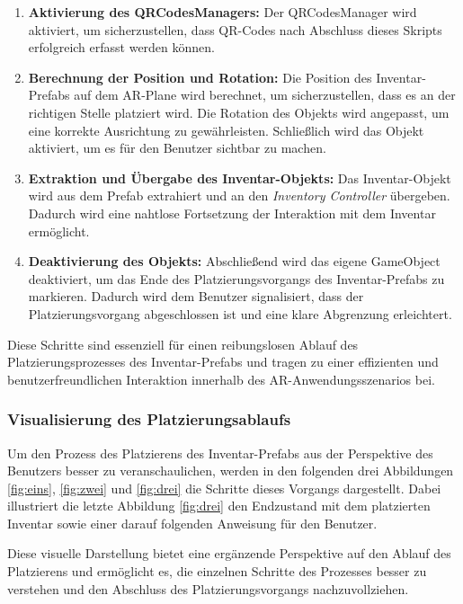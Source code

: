 \begin{enumerate}
    \item \textbf{Aktivierung des QRCodesManagers:} Der QRCodesManager wird aktiviert, um sicherzustellen, dass QR-Codes
    nach Abschluss dieses Skripts erfolgreich erfasst werden können.

    \item \textbf{Berechnung der Position und Rotation:} Die Position des Inventar-Prefabs auf dem AR-Plane wird berechnet,
    um sicherzustellen, dass es an der richtigen Stelle platziert wird. Die Rotation des Objekts wird angepasst, um eine
    korrekte Ausrichtung zu gewährleisten. Schließlich wird das Objekt aktiviert, um es für den Benutzer sichtbar zu machen.

    \item \textbf{Extraktion und Übergabe des Inventar-Objekts:} Das Inventar-Objekt wird aus dem Prefab extrahiert und an
    den \textit{Inventory Controller} übergeben. Dadurch wird eine nahtlose Fortsetzung der Interaktion mit dem Inventar ermöglicht.

    \item \textbf{Deaktivierung des Objekts:} Abschließend wird das eigene GameObject deaktiviert, um das Ende des
    Platzierungsvorgangs des Inventar-Prefabs zu markieren. Dadurch wird dem Benutzer signalisiert, dass der Platzierungsvorgang
    abgeschlossen ist und eine klare Abgrenzung erleichtert.
\end{enumerate}

Diese Schritte sind essenziell für einen reibungslosen Ablauf des Platzierungsprozesses des Inventar-Prefabs und tragen
zu einer effizienten und benutzerfreundlichen Interaktion innerhalb des AR-Anwendungsszenarios bei.

\subsubsection{Visualisierung des Platzierungsablaufs}\label{sec:platzierungsablauf}
Um den Prozess des Platzierens des Inventar-Prefabs aus der Perspektive des Benutzers besser zu veranschaulichen, werden
in den folgenden drei Abbildungen \ref{fig:eins}, \ref{fig:zwei} und \ref{fig:drei} die Schritte dieses Vorgangs dargestellt.
Dabei illustriert die letzte Abbildung \ref{fig:drei} den Endzustand mit dem platzierten Inventar sowie einer darauf
folgenden Anweisung für den Benutzer.

Diese visuelle Darstellung bietet eine ergänzende Perspektive auf den Ablauf des Platzierens und ermöglicht es, die
einzelnen Schritte des Prozesses besser zu verstehen und den Abschluss des Platzierungsvorgangs nachzuvollziehen.

